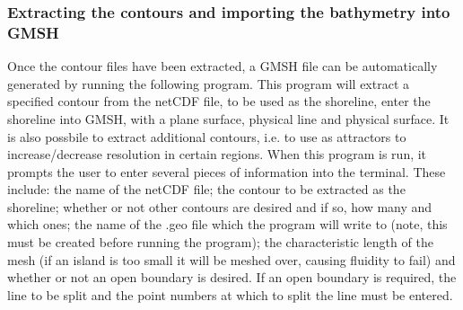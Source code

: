 \subsubsection{Extracting the contours and importing the bathymetry into GMSH}

Once the contour files have been extracted, a GMSH file can be automatically generated by 
running the following program. This program will extract a specified contour from the 
netCDF file, to be used as the shoreline, enter the shoreline into GMSH, with a plane 
surface, physical line and physical surface. It is also possbile to extract additional contours, 
i.e. to use as attractors to increase/decrease resolution in certain regions. 
When this program is run, it prompts the user to enter several 
pieces of information into the terminal. These include: the name of the netCDF file; 
the contour to be extracted as the shoreline; whether or not other contours are desired and 
if so, how many and  which ones; the name of the .geo file which the program will write to 
(note, this must be created before running the program); the characteristic length of 
the mesh (if an island is too small it will be meshed over, causing fluidity to fail) 
and whether or not an open boundary is desired. If an open boundary is required, the line 
to be split and the point numbers at which to split the line must be entered.

